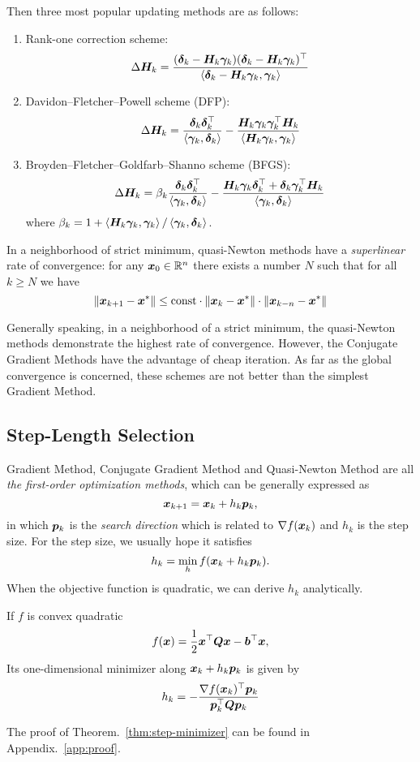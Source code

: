 Then three most popular updating methods are as follows:
\begin{enumerate}
    \item {Rank-one correction scheme}:
        \[
            \Delta \bm{H}_k = \frac{(\bm{\delta}_k - \bm{H}_k\bm{\gamma}_k)(\bm{\delta}_k - \bm{H}_k\bm{\gamma}_k)^\top}{\left\langle \bm{\delta}_k - \bm{H}_k\bm{\gamma}_k,\bm{\gamma}_k \right\rangle}  
        \]
    \item {Davidon–Fletcher–Powell scheme (DFP)}:
        \[
            \Delta \bm{H}_k = \frac{\bm{\delta}_k\bm{\delta}_k^\top}{\left\langle \bm{\gamma}_k,\bm{\delta}_k \right\rangle} 
            - \frac{\bm{H}_k\bm{\gamma}_k\bm{\gamma}_k^\top\bm{H}_k}{\left\langle \bm{H}_k\bm{\gamma}_k,\bm{\gamma}_k \right\rangle}
        \]
    \item {Broyden–Fletcher–Goldfarb–Shanno scheme (BFGS)}:
        \[
            \Delta \bm{H}_k = \beta_k \frac{\bm{\delta}_k\bm{\delta}_k^\top}{\left\langle \bm{\gamma}_k,\bm{\delta}_k \right\rangle} 
            - \frac{\bm{H}_k\bm{\gamma}_k\bm{\delta}_k^\top + \bm{\delta}_k\bm{\gamma}_k^\top\bm{H}_k}{\left\langle \bm{\gamma}_k,\bm{\delta}_k \right\rangle}
        \]
        where \(\beta_k = 1 + \left\langle \bm{H}_k\bm{\gamma}_k,\bm{\gamma}_k \right\rangle / \left\langle \bm{\gamma}_k,\bm{\delta}_k \right\rangle\).
\end{enumerate}

In a neighborhood of strict minimum, quasi-Newton methods have a \emph{superlinear} rate of convergence: for any \(\bm{x}_0 \in \mathbb{R}^n\) there exists a
number \(N\) such that for all \(k \ge N\) we have
\[
    \norm{\bm{x}_{k+1} - \bm{x}^*} \le \text{const} \cdot \norm{\bm{x}_k - \bm{x}^*} \cdot \norm{\bm{x}_{k-n} - \bm{x}^*} 
\]

Generally speaking, in a neighborhood of a strict minimum, the quasi-Newton methods demonstrate the highest rate of convergence. However,
the Conjugate Gradient Methods have the advantage of cheap iteration. As far as the global convergence is concerned, these schemes are not 
better than the simplest Gradient Method.

\subsection{Step-Length Selection}

Gradient Method, Conjugate Gradient Method and Quasi-Newton Method are all \emph{the first-order optimization methods}, 
which can be generally expressed as
\[
    \bm{x}_{k+1} = \bm{x}_k + h_k \bm{p}_k,  
\] 
in which \(\bm{p}_k\) is the \emph{search direction} which is related to \(\nabla f(\bm{x}_k)\) and \(h_k\) is the step size. For the step size, we usually hope
it satisfies
\[
    h_k = \min_{h} f(\bm{x}_k + h_k \bm{p}_k).  
\]
When the objective function is quadratic, we can derive \(h_k\) analytically.

\begin{thm}\label{thm:step-minimizer}
    If \(f\) is convex quadratic
    \[
        f(\bm{x}) = \frac{1}{2} \bm{x}^\top \bm{Q} \bm{x} - \bm{b}^\top \bm{x},  
    \]
    Its one-dimensional minimizer along \(\bm{x}_k + h_k \bm{p}_k\) is given by
    \[
        h_k = -\frac{\nabla f(\bm{x}_k)^\top \bm{p}_k}
        {\bm{p}_k^\top \bm{Q}\bm{p}_k}    
    \]
\end{thm}
The proof of Theorem.~\ref{thm:step-minimizer} can be found in Appendix.~\ref{app:proof}.

